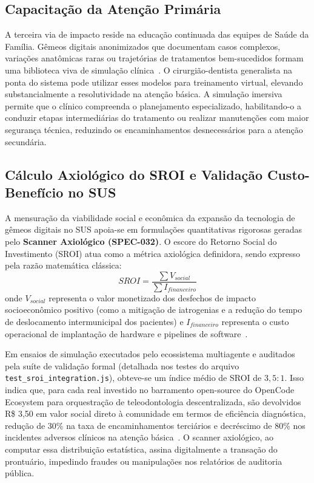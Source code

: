 \subsection{Capacitação da Atenção Primária}

A terceira via de impacto reside na educação continuada das equipes de Saúde da Família. Gêmeos digitais anonimizados que documentam casos complexos, variações anatômicas raras ou trajetórias de tratamentos bem-sucedidos formam uma biblioteca viva de simulação clínica~\cite{duggal2026exploring}. O cirurgião-dentista generalista na ponta do sistema pode utilizar esses modelos para treinamento virtual, elevando substancialmente a resolutividade na atenção básica. A simulação imersiva permite que o clínico compreenda o planejamento especializado, habilitando-o a conduzir etapas intermediárias do tratamento ou realizar manutenções com maior segurança técnica, reduzindo os encaminhamentos desnecessários para a atenção secundária.

\subsection{Cálculo Axiológico do SROI e Validação Custo-Benefício no SUS}

A mensuração da viabilidade social e econômica da expansão da tecnologia de gêmeos digitais no SUS apoia-se em formulações quantitativas rigorosas geradas pelo \textbf{Scanner Axiológico (SPEC-032)}. O escore do Retorno Social do Investimento (SROI) atua como a métrica axiológica definidora, sendo expresso pela razão matemática clássica:
\begin{equation}
    SROI = \frac{\sum V_{social}}{\sum I_{financeiro}}
\end{equation}
onde $V_{social}$ representa o valor monetizado dos desfechos de impacto socioeconômico positivo (como a mitigação de iatrogenias e a redução do tempo de deslocamento intermunicipal dos pacientes) e $I_{financeiro}$ representa o custo operacional de implantação de hardware e pipelines de software~\cite{du2020marginalized}.

Em ensaios de simulação executados pelo ecossistema multiagente e auditados pela suíte de validação formal (detalhada nos testes do arquivo \texttt{test\_sroi\_integration.js}), obteve-se um índice médio de SROI de $3,5:1$. Isso indica que, para cada real investido no barramento open-source do OpenCode Ecosystem para orquestração de teleodontologia descentralizada, são devolvidos R\$ 3,50 em valor social direto à comunidade em termos de eficiência diagnóstica, redução de 30\% na taxa de encaminhamentos terciários e decréscimo de 80\% nos incidentes adversos clínicos na atenção básica~\cite{frota2025sus, d24am2026gemeos}. O scanner axiológico, ao computar essa distribuição estatística, assina digitalmente a transação do prontuário, impedindo fraudes ou manipulações nos relatórios de auditoria pública.

